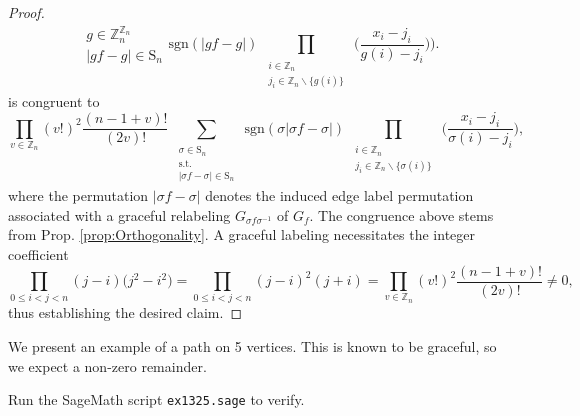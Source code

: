 \begin{proof}
\[{\begin{array}{c}
g\in\mathbb{Z}_{n}^{\mathbb{Z}_{n}}\\
|gf-g|\in\text{S}_{n}
\end{array}}\text{sgn}(|gf-g|)\prod_{\begin{array}{c}
\substack{i\in\mathbb{Z}_{n}\\
j_{i}\in\mathbb{Z}_{n}\backslash\{g(i)\}
}
\end{array}}\big(\frac{x_{i}-j_{i}}{g(i)-j_{i}}\big)\bigg).
\]
is congruent to
\begin{equation} \label{eq:graceful-evaluation}
\prod_{v\in\mathbb{Z}_{n}}(v!)^{2}\frac{(n-1+v)!}{(2v)!}\sum_{\begin{array}{c}
\substack{\sigma\in\text{S}_{n}\\
\text{s.t.}\\
\left|\sigma f-\sigma\right|\in\text{S}_{n}
}
\end{array}}\text{sgn}(\sigma\left|\sigma f-\sigma\right|)\prod_{\begin{array}{c}
\substack{i\in\mathbb{Z}_{n}\\
j_{i}\in\mathbb{Z}_{n}\backslash\{\sigma(i)\}
}
\end{array}}\big(\frac{x_{i}-j_{i}}{\sigma(i)-j_{i}}\big),
\end{equation}
where the permutation $|\sigma f-\sigma |$ denotes the induced edge label permutation associated with a graceful relabeling $G_{\sigma f\sigma^{-1}}$ of $G_f$.
The congruence above stems from Prop. \ref{prop:Orthogonality}. A graceful labeling necessitates the integer coefficient
\[
\prod_{0\le i<j<n}(j-i)\big(j^{2}-i^{2})=\prod_{0\le i<j<n}(j-i)^{2}(j+i)=\prod_{v\in\mathbb{Z}_{n}}\left(v!\right)^{2}\frac{\left(n-1+v\right)!}{\left(2v\right)!} \neq 0,
\]
thus establishing the desired claim.
\end{proof}
\begin{example} We present an example of a path on 5 vertices. This is known to be graceful, so we expect a non-zero remainder.
\ \\
\begin{center}   
\end{center}
Run the SageMath script \texttt{ex1325.sage} to verify.
\end{example}

